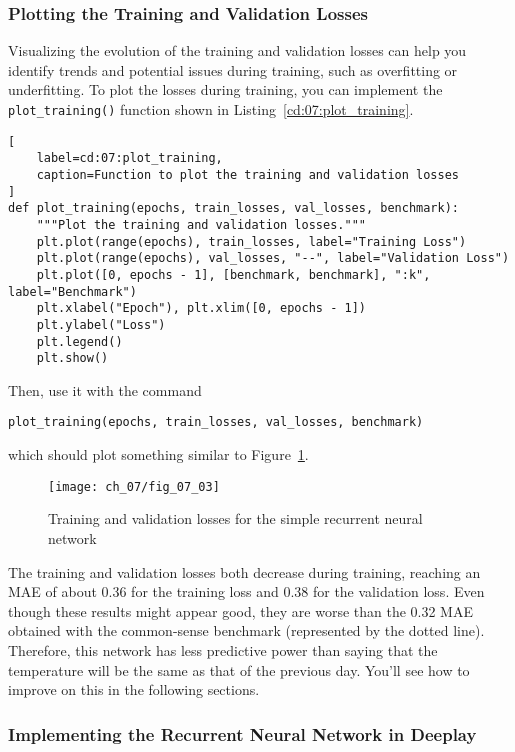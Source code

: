 \subsubsection{Plotting the Training and Validation Losses}

Visualizing the evolution of the training and validation losses can help you identify trends and potential issues during training, such as overfitting or underfitting. To plot the losses during training, you can implement the \lstinline{plot_training()} function shown in Listing~\ref{cd:07:plot_training}.
\begin{lstlisting}[
    label=cd:07:plot_training,
    caption=Function to plot the training and validation losses
]
def plot_training(epochs, train_losses, val_losses, benchmark):
    """Plot the training and validation losses."""
    plt.plot(range(epochs), train_losses, label="Training Loss")
    plt.plot(range(epochs), val_losses, "--", label="Validation Loss")
    plt.plot([0, epochs - 1], [benchmark, benchmark], ":k", label="Benchmark")
    plt.xlabel("Epoch"), plt.xlim([0, epochs - 1])
    plt.ylabel("Loss")
    plt.legend()
    plt.show()
\end{lstlisting}
Then, use it with the command
\begin{lstlisting}
plot_training(epochs, train_losses, val_losses, benchmark)
\end{lstlisting}
which should plot something similar to Figure~\ref{fig:07:03}.

\begin{figure}[H]
	\texttt{[image: ch\_07/fig\_07\_03]} 
	\caption{Training and validation losses for the simple recurrent neural network}
	\label{fig:07:03}
\end{figure}

The training and validation losses both decrease during training, reaching an MAE of about 0.36 for the training loss and 0.38 for the validation loss. Even though these results might appear good, they are worse than the 0.32 MAE obtained with the common-sense benchmark (represented by the dotted line). Therefore, this network has less predictive power than saying that the temperature will be the same as that of the previous day. You'll see how to improve on this in the following sections.

\subsubsection{Implementing the Recurrent Neural Network in Deeplay}

